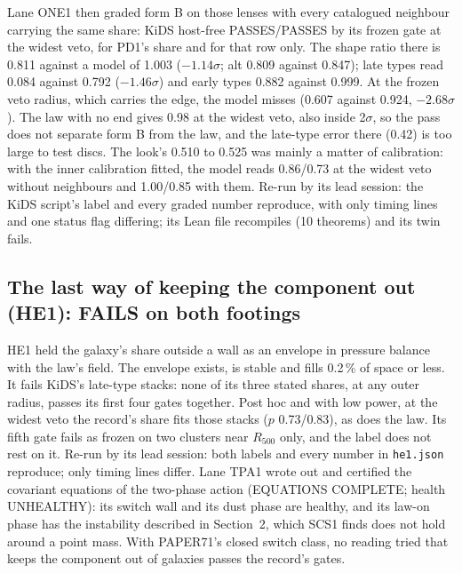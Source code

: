 \documentclass[10pt]{article}
\begin{document}
Lane ONE1 then graded form B on those lenses with every catalogued neighbour carrying the same share: KiDS host-free PASSES/PASSES by its frozen gate at the widest veto, for PD1's share and for that row only. The shape ratio there is 0.811 against a model of 1.003 ($-1.14\sigma$; alt 0.809 against 0.847); late types read 0.084 against 0.792 ($-1.46\sigma$) and early types 0.882 against 0.999. At the frozen veto radius, which carries the edge, the model misses (0.607 against 0.924, $-2.68\sigma$). The law with no end gives 0.98 at the widest veto, also inside 2$\sigma$, so the pass does not separate form B from the law, and the late-type error there (0.42) is too large to test discs. The look's 0.510 to 0.525 was mainly a matter of calibration: with the inner calibration fitted, the model reads 0.86/0.73 at the widest veto without neighbours and 1.00/0.85 with them. Re-run by its lead session: the KiDS script's label and every graded number reproduce, with only timing lines and one status flag differing; its Lean file recompiles (10 theorems) and its twin fails.

\subsection{The last way of keeping the component out (HE1): FAILS on both footings}
HE1 held the galaxy's share outside a wall as an envelope in pressure balance with the law's field. The envelope exists, is stable and fills 0.2\,\% of space or less. It fails KiDS's late-type stacks: none of its three stated shares, at any outer radius, passes its first four gates together. Post hoc and with low power, at the widest veto the record's share fits those stacks ($p$ 0.73/0.83), as does the law. Its fifth gate fails as frozen on two clusters near $R_{500}$ only, and the label does not rest on it. Re-run by its lead session: both labels and every number in \texttt{he1.json} reproduce; only timing lines differ. Lane TPA1 wrote out and certified the covariant equations of the two-phase action (EQUATIONS COMPLETE; health UNHEALTHY): its switch wall and its dust phase are healthy, and its law-on phase has the instability described in Section~2, which SCS1 finds does not hold around a point mass. With PAPER71's closed switch class, no reading tried that keeps the component out of galaxies passes the record's gates.
\end{document}
